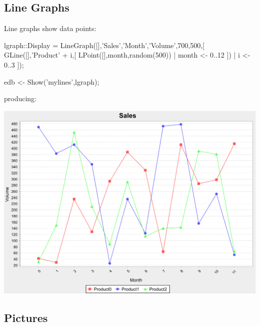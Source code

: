 \documentclass[5p,times]{elsarticle}
\begin{document}
\subsection{Line Graphs}

\label{sec:lines}

Line graphs show data points:
\begin{ESL}
lgraph::Display = 
  LineGraph([],'Sales','Month','Volume',700,500,[
    GLine([],'Product' + i,[
      LPoint([],month,random(500)) | month <- 0..12 ]) 
    | i <- 0..3 ]);

edb <- Show('mylines',lgraph);
\end{ESL}
producing:
\begin{center}
\includegraphics[width=\columnwidth]{lines}
\end{center}

\subsection{Pictures}

\label{sec:picture}
\end{document}
